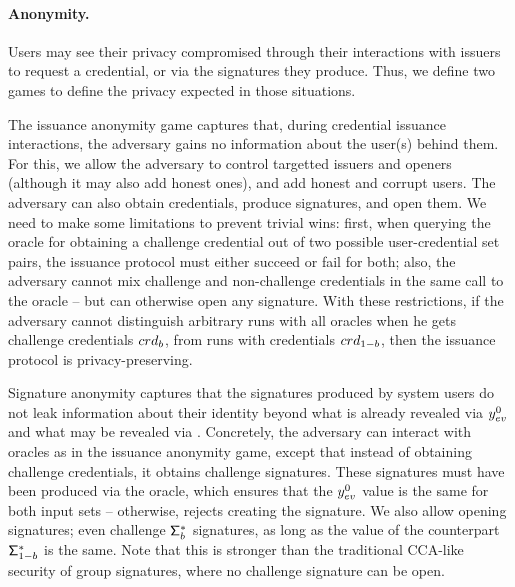 
\paragraph{Anonymity.} %
Users may see their privacy compromised through their interactions with issuers
to request a credential, or via the signatures they produce. Thus, we define two
games to define the privacy expected in those situations.

The issuance anonymity game captures that, during credential issuance
interactions, the adversary gains no information about the
user(s) behind them. For this, we allow the adversary to control targetted
issuers and openers (although it may also add honest ones), and add honest and
corrupt users. The adversary can also obtain credentials, produce signatures,
and open them. We need to make some limitations to prevent trivial wins: first,
when querying the oracle for obtaining a challenge credential out of two
possible user-credential set pairs, the issuance protocol must either succeed or
fail for both; also, the adversary cannot mix challenge and non-challenge
credentials in the same call to the \SIGN oracle -- but can otherwise open
any signature. With these restrictions, if the adversary cannot distinguish
arbitrary runs with all oracles when he gets challenge credentials
$crd_b$, from runs with credentials $crd_{1-b}$, then the issuance protocol
is privacy-preserving.

Signature anonymity captures that the signatures produced by system users do not
leak information
about their identity beyond what is already revealed via $y_{ev}^0$ and what
may be revealed via \yinsp. Concretely, the adversary can interact with oracles
as in the issuance anonymity game, except that instead of obtaining challenge
credentials, it obtains challenge signatures. These signatures must have been
produced via the \CHALb oracle, which ensures that the $y_{ev}^0$ value is the
same for both input sets -- otherwise, rejects creating the signature. We also
allow opening signatures; even challenge $\mathsf{\Sigma}^*_b$ signatures, as long as the
\yinsp value of the counterpart $\mathsf{\Sigma}^*_{1-b}$ is the same. Note that this is
stronger than the traditional CCA-like security of group signatures, where no
challenge signature can be open.

